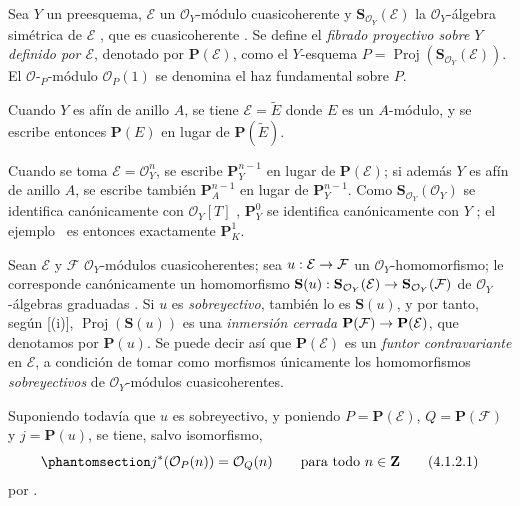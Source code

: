 \documentclass[oneside,10pt]{amsart}
\makeatletter
\newcommand{\ega@arrow}[2]{\mathchoice{#1}{#2}{#2}{#2}}
\renewcommand{\to}{\ega@arrow{\longrightarrow}{\rightarrow}}
\let\EGAOriginalLabel\label
\renewcommand{\label}[1]{\phantomsection\EGAOriginalLabel{#1}}
\makeatother
\begin{document}
\begin{definition}[4.1.1]
\label{II.4.1.1-fr}
Sea $Y$ un preesquema, $\mathcal{E}$ un $\mathcal{O}_Y$-módulo cuasicoherente y $\mathbf{S}_{\mathcal{O}_Y}(\mathcal{E})$ la $\mathcal{O}_Y$-álgebra simétrica de $\mathcal{E}$ , que es cuasicoherente .
Se define el \emph{fibrado proyectivo sobre $Y$ definido por $\mathcal{E}$}, denotado por $\mathbf{P}(\mathcal{E})$, como el $Y$-esquema $P=\operatorname{Proj}(\mathbf{S}_{\mathcal{O}_Y}(\mathcal{E}))$.
El $\mathcal{O}$-${}_P$-módulo $\mathcal{O}_P(1)$ se denomina el haz fundamental sobre $P$.
\end{definition}

Cuando $Y$ es afín de anillo $A$, se tiene $\mathcal{E}=\widetilde{E}$ donde $E$ es un $A$-módulo, y se escribe entonces $\mathbf{P}(E)$ en lugar de $\mathbf{P}(\widetilde{E})$.

Cuando se toma $\mathcal{E}=\mathcal{O}_Y^n$, se escribe $\mathbf{P}_Y^{n-1}$ en lugar de $\mathbf{P}(\mathcal{E})$;
si además $Y$ es afín de anillo $A$, se escribe también $\mathbf{P}_A^{n-1}$ en lugar de $\mathbf{P}_Y^{n-1}$.
Como $\mathbf{S}_{\mathcal{O}_Y}(\mathcal{O}_Y)$ se identifica canónicamente con $\mathcal{O}_Y[T]$ , $\mathbf{P}_Y^0$ se identifica canónicamente con $Y$ ;
el ejemplo~ es entonces exactamente $\mathbf{P}_K^1$.

\begin{env}[4.1.2]
\label{II.4.1.2-fr}
Sean $\mathcal{E}$ y $\mathcal{F}$ $\mathcal{O}_Y$-módulos cuasicoherentes;
sea $u:\mathcal{E}\to\mathcal{F}$ un $\mathcal{O}_Y$-homomorfismo;
le corresponde canónicamente un homomorfismo $\mathbf{S}(u):\mathbf{S}_{\mathcal{O}_Y}(\mathcal{E})\to
\mathbf{S}_{\mathcal{O}_Y}(\mathcal{F})$ de $\mathcal{O}_Y$-álgebras graduadas .
Si $u$ es \emph{sobreyectivo}, también lo es $\mathbf{S}(u)$, y por tanto, según [(i)], $\operatorname{Proj}(\mathbf{S}(u))$ es una \emph{inmersión cerrada} $\mathbf{P}(\mathcal{F})\to\mathbf{P}(\mathcal{E})$, que denotamos por $\mathbf{P}(u)$.
Se puede decir así que $\mathbf{P}(\mathcal{E})$ es un \emph{funtor contravariante} en $\mathcal{E}$, a condición de tomar como morfismos únicamente los homomorfismos \emph{sobreyectivos} de $\mathcal{O}_Y$-módulos cuasicoherentes.

Suponiendo todavía que $u$ es sobreyectivo, y poniendo $P=\mathbf{P}(\mathcal{E})$, $Q=\mathbf{P}(\mathcal{F})$ y $j=\mathbf{P}(u)$, se tiene, salvo isomorfismo,
\[
\label{II.4.1.2.1-fr}
  j^*(\mathcal{O}_P(n))=\mathcal{O}_Q(n)
  \qquad\text{para todo }n\in\mathbf{Z}
\tag{4.1.2.1}
\]
por .
\end{env}
\end{document}
